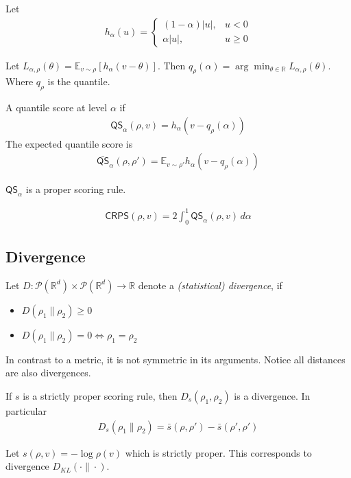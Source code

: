 \documentclass[11pt,fleqn]{article}
\numberwithin{equation}{section}
\theoremstyle{definition}
\theoremstyle{definition}
\begin{document}
\begin{definition}
	Let
	\begin{align}
		h_\alpha(u) = \begin{cases}
			(1-\alpha) |u|, & u < 0\\
			\alpha |u|, & u \geq 0
		\end{cases}
	\end{align}
\end{definition}
\begin{lemma}
	Let $L_{\alpha, \rho}(\theta) = \mathbb E_{v \sim \rho} [h_\alpha(v - \theta)]$. Then $q_\rho(\alpha) = \arg \min_{\theta \in \mathbb R} L_{\alpha, \rho}(\theta)$. Where $q_\rho$ is the quantile.
\end{lemma}
\begin{definition}
	 A quantile score at level $\alpha$ if
	\begin{align}
		\textsf{QS}_\alpha(\rho, v) = h_\alpha(v - q_\rho(\alpha))
	\end{align}
	The expected quantile score is
	\begin{align}
		\bar{\textsf{QS}}_\alpha(\rho, \rho') = \mathbb E_{v \sim \rho'} h_\alpha(v - q_\rho(\alpha))
	\end{align}
\end{definition}
\begin{lemma}
	$\textsf{QS}_\alpha$ is a proper scoring rule.
\end{lemma}

\begin{theorem}
	\begin{align}
		\textsf{CRPS}(\rho, v) = 2 \int_0^1 \textsf{QS}_\alpha(\rho, v) \, d\alpha
	\end{align}
\end{theorem}

\subsection{Divergence}
\begin{definition}
	[Divergence] Let $D : \mathcal P(\mathbb R^d) \times \mathcal P(\mathbb R^d) \to \mathbb R$ denote a \emph{(statistical) divergence}, if 
	\begin{itemize}
		\item $D(\rho_1 \| \rho_2) \geq 0$ 
		\item $D(\rho_1 \| \rho_2) = 0 \iff \rho_1 = \rho_2$
	\end{itemize}
	In contrast to a metric, it is not symmetric in its arguments. Notice all distances are also divergences.
\end{definition}
\begin{theorem}
	If $s$ is a strictly proper scoring rule, then $D_s(\rho_1, \rho_2)$ is a divergence. In particular
	\begin{align}
		D_s(\rho_1 \| \rho_2) = \bar s(\rho, \rho') - \bar s(\rho' , \rho')
	\end{align}
\end{theorem}
\begin{eg}
	Let $s(\rho, v) = - \log \rho(v)$ which is strictly proper. This corresponds to divergence $D_{KL} (\cdot \| \cdot)$.
\end{eg}
\end{document}
